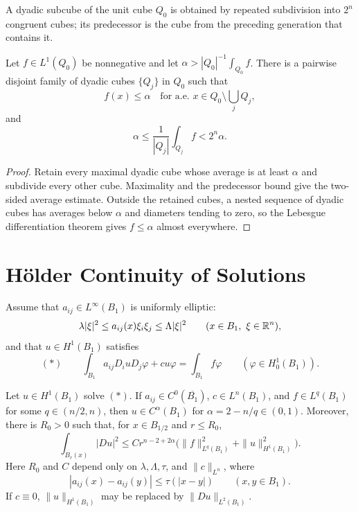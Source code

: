 A dyadic subcube of the unit cube $Q_0$ is obtained by repeated subdivision
into $2^n$ congruent cubes; its predecessor is the cube from the preceding
generation that contains it.

\begin{lemma}\label{hanlin:weaksol-part1-cz}
Let $f\in L^1(Q_0)$ be nonnegative and let
$\alpha>|Q_0|^{-1}\int_{Q_0}f$. There is a pairwise disjoint family of
dyadic cubes $\{Q_j\}$ in $Q_0$ such that
\[
f(x)\leq\alpha\quad\text{for a.e. }x\in Q_0\setminus\bigcup_jQ_j,
\]
and
\[
\alpha\leq\frac1{|Q_j|}\int_{Q_j}f<2^n\alpha.
\]
\end{lemma}
\begin{proof}
\sketch Retain every maximal dyadic cube whose average is at least $\alpha$
and subdivide every other cube. Maximality and the predecessor bound give the
two-sided average estimate. Outside the retained cubes, a nested sequence of
dyadic cubes has averages below $\alpha$ and diameters tending to zero, so the
Lebesgue differentiation theorem gives $f\leq\alpha$ almost everywhere.
\end{proof}

\section{H\"older Continuity of Solutions}

Assume that $a_{ij}\in L^\infty(B_1)$ is uniformly elliptic:
\[
\lambda|\xi|^2\leq a_{ij}(x)\xi_i\xi_j\leq\Lambda|\xi|^2
\qquad(x\in B_1,\ \xi\in\mathbb{R}^n),
\]
and that $u\in H^1(B_1)$ satisfies
\[
(\ast)\qquad
\int_{B_1}a_{ij}D_i uD_j\varphi+cu\varphi
=\int_{B_1}f\varphi
\qquad(\varphi\in H^1_0(B_1)).
\]

\begin{theorem}\label{hanlin:weaksol-part1-holder-sol}
Let $u\in H^1(B_1)$ solve $(\ast)$. If
$a_{ij}\in C^0(\overline{B_1})$, $c\in L^n(B_1)$, and
$f\in L^q(B_1)$ for some $q\in(n/2,n)$, then
$u\in C^\alpha(B_1)$ for $\alpha=2-n/q\in(0,1)$.
Moreover, there is $R_0>0$ such that, for $x\in B_{1/2}$ and $r\leq R_0$,
\[
\int_{B_r(x)}|Du|^2
\leq Cr^{n-2+2\alpha}
\bigl(\|f\|_{L^q(B_1)}^2+\|u\|_{H^1(B_1)}^2\bigr).
\]
Here $R_0$ and $C$ depend only on $\lambda,\Lambda,\tau$, and
$\|c\|_{L^n}$, where
\[
|a_{ij}(x)-a_{ij}(y)|\leq\tau(|x-y|)
\qquad(x,y\in B_1).
\]
If $c\equiv0$, $\|u\|_{H^1(B_1)}$ may be replaced by
$\|Du\|_{L^2(B_1)}$.
\end{theorem}

